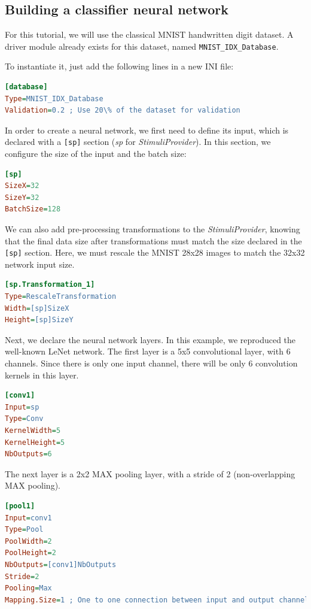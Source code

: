 \documentclass[a4paper,11pt,oneside]{article}
\begin{document}
\subsection{\label{sec:BuildingClassifierNN}Building a classifier neural
network}

For this tutorial, we will use the classical MNIST handwritten digit dataset.
A driver module already exists for this dataset, named
\lstinline!MNIST_IDX_Database!.

To instantiate it, just add the following lines in a new INI file:

\begin{lstlisting}[language=ini]
[database]
Type=MNIST_IDX_Database
Validation=0.2 ; Use 20\% of the dataset for validation
\end{lstlisting}

In order to create a neural network, we first need to define its input, which is
declared with a \lstinline![sp]! section (\emph{sp} for \emph{StimuliProvider}).
In this section, we configure the size of the input and the batch size:

\begin{lstlisting}[language=ini]
[sp]
SizeX=32
SizeY=32
BatchSize=128
\end{lstlisting}

We can also add pre-processing transformations to the \emph{StimuliProvider},
knowing that the final data size after transformations must match the size
declared in the \lstinline![sp]! section. Here, we must rescale the MNIST 28x28
images to match the 32x32 network input size.

\begin{lstlisting}[language=ini]
[sp.Transformation_1]
Type=RescaleTransformation
Width=[sp]SizeX
Height=[sp]SizeY
\end{lstlisting}

Next, we declare the neural network layers. In this example, we reproduced the
well-known LeNet network. The first layer is a 5x5 convolutional layer, with
6 channels. Since there is only one input channel, there will be only 6
convolution kernels in this layer.

\begin{lstlisting}[language=ini]
[conv1]
Input=sp
Type=Conv
KernelWidth=5
KernelHeight=5
NbOutputs=6
\end{lstlisting}

The next layer is a 2x2 MAX pooling layer, with a stride of 2 (non-overlapping
MAX pooling).

\begin{lstlisting}[language=ini]
[pool1]
Input=conv1
Type=Pool
PoolWidth=2
PoolHeight=2
NbOutputs=[conv1]NbOutputs
Stride=2
Pooling=Max
Mapping.Size=1 ; One to one connection between input and output channels
\end{lstlisting}
\end{document}
